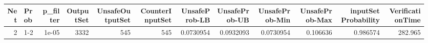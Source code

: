 \begin{tabular}{rlrrrrrrrrrr}
\hline
   Net & Prob   &   p\_filter &   OutputSet &   UnsafeOutputSet &   CounterInputSet &   UnsafeProb-LB &   UnsafeProb-UB &   UnsafeProb-Min &   UnsafeProb-Max &   inputSet Probability &   VerificationTime \\
\hline
     2 & 1-2    &      1e-05 &        3332 &               545 &               545 &       0.0730954 &       0.0932093 &        0.0730954 &         0.106636 &               0.986574 &            282.965 \\
\hline
\end{tabular}
